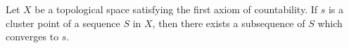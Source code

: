 Let $X$ be a topological space satisfying the first axiom of countability. If $s$ is a cluster point of a sequence $S$ in $X$, then there exists a subsequence of $S$ which converges to $s$.
